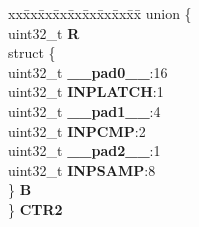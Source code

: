 \begin{DoxyCompactItemize}
\begin{tabbing}
\end{tabbing}\item 
\mbox{\label{structADC__tag_a763d38a831b3c768bff8880684a01be8}} 
\begin{tabbing}
xx\=xx\=xx\=xx\=xx\=xx\=xx\=xx\=xx\=\kill
union \{\\
\>uint32\_t {\bfseries R}\\
\>struct \{\\
\>\>uint32\_t {\bfseries \_\_pad0\_\_}:16\\
\>\>uint32\_t {\bfseries INPLATCH}:1\\
\>\>uint32\_t {\bfseries \_\_pad1\_\_}:4\\
\>\>uint32\_t {\bfseries INPCMP}:2\\
\>\>uint32\_t {\bfseries \_\_pad2\_\_}:1\\
\>\>uint32\_t {\bfseries INPSAMP}:8\\
\>\} {\bfseries B}\\
\} {\bfseries CTR2}\\


\end{tabbing}
\end{DoxyCompactItemize}
